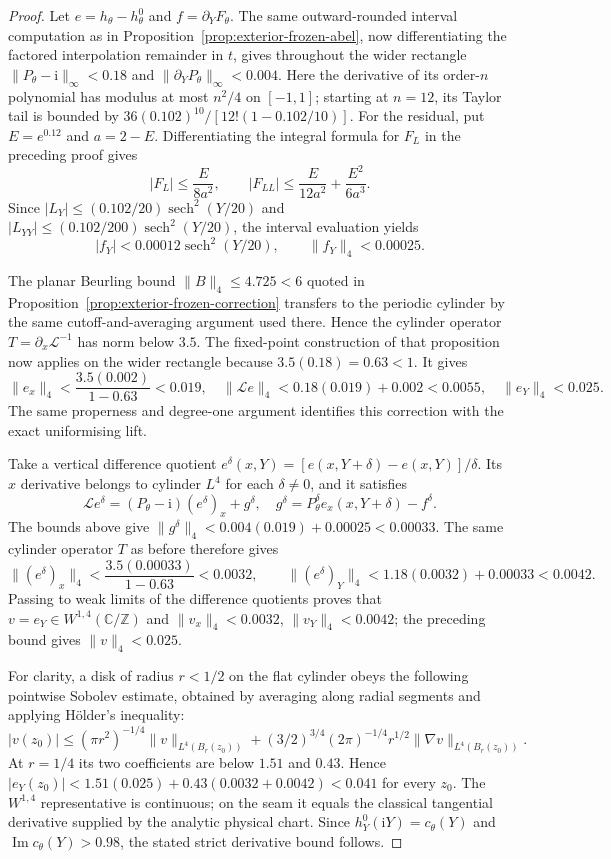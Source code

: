 \documentclass[11pt]{amsart}
\theoremstyle{definition}
\newcommand{\ii}{\mathrm{i}}
\begin{document}
\begin{proof}
Let $e=h_\theta-h^0_\theta$ and $f=\partial_YF_\theta$.
The same outward-rounded interval computation as in
Proposition~\ref{prop:exterior-frozen-abel}, now differentiating
the factored interpolation remainder in $t$, gives throughout the
wider rectangle
$\|P_\theta-\ii\|_\infty<0.18$ and
$\|\partial_YP_\theta\|_\infty<0.004$.
Here the derivative of its order-$n$ polynomial has modulus at most
$n^2/4$ on $[-1,1]$; starting at $n=12$, its Taylor tail is bounded by
$36(0.102)^{10}/[12!(1-0.102/10)]$.
For the residual, put $E=e^{0.12}$ and $a=2-E$.  Differentiating
the integral formula for $F_L$ in the preceding proof gives
\[
 |F_L|\le\frac{E}{8a^2},\qquad
 |F_{LL}|\le\frac{E}{12a^2}+\frac{E^2}{6a^3}.
\]
Since $|L_Y|\le(0.102/20)\operatorname{sech}^2(Y/20)$ and
$|L_{YY}|\le(0.102/200)\operatorname{sech}^2(Y/20)$,
the interval evaluation yields
\[
 |f_Y|<0.00012\operatorname{sech}^2(Y/20),
 \qquad \|f_Y\|_4<0.00025.
\]

The planar Beurling bound $\|B\|_4\le4.725<6$ quoted in
Proposition~\ref{prop:exterior-frozen-correction} transfers to the
periodic cylinder by the same cutoff-and-averaging argument used
there.  Hence the cylinder operator
$T=\partial_x\mathcal L^{-1}$ has norm below $3.5$.
The fixed-point construction of that proposition now applies on
the wider rectangle because $3.5(0.18)=0.63<1$.  It gives
\[
 \|e_x\|_4<\frac{3.5(0.002)}{1-0.63}<0.019,
 \quad \|\mathcal Le\|_4<0.18(0.019)+0.002<0.0055,
 \quad \|e_Y\|_4<0.025.
\]
The same properness and degree-one argument identifies this
correction with the exact uniformising lift.

Take a vertical difference quotient $e^\delta(x,Y)
=[e(x,Y+\delta)-e(x,Y)]/\delta$.  Its $x$ derivative belongs
to cylinder $L^4$ for each $\delta\ne0$, and it satisfies
\[
 \mathcal Le^\delta=(P_\theta-\ii)(e^\delta)_x+g^\delta,
 \quad
 g^\delta=P_\theta^\delta e_x(x,Y+\delta)-f^\delta.
\]
The bounds above give
$\|g^\delta\|_4<0.004(0.019)+0.00025<0.00033$.
The same cylinder operator $T$ as before therefore gives
\[
 \|(e^\delta)_x\|_4
 <\frac{3.5(0.00033)}{1-0.63}<0.0032,
 \qquad
 \|(e^\delta)_Y\|_4
 <1.18(0.0032)+0.00033<0.0042.
\]
Passing to weak limits of the difference quotients proves that
$v=e_Y\in W^{1,4}(\mathbb C/\mathbb Z)$ and
$\|v_x\|_4<0.0032$, $\|v_Y\|_4<0.0042$;
the preceding bound gives $\|v\|_4<0.025$.

For clarity, a disk of radius $r<1/2$ on the flat cylinder obeys
the following pointwise Sobolev estimate, obtained by averaging
along radial segments and applying H\"older's inequality:
\[
 |v(z_0)|\le(\pi r^2)^{-1/4}\|v\|_{L^4(B_r(z_0))}
 +(3/2)^{3/4}(2\pi)^{-1/4}r^{1/2}
        \|\nabla v\|_{L^4(B_r(z_0))}.
\]
At $r=1/4$ its two coefficients are below $1.51$ and $0.43$.
Hence $|e_Y(z_0)|<1.51(0.025)+0.43(0.0032+0.0042)<0.041$
for every $z_0$.  The $W^{1,4}$ representative is continuous;
on the seam it equals the classical tangential derivative supplied
by the analytic physical chart.  Since
$h^0_Y(\ii Y)=c_\theta(Y)$ and
$\operatorname{Im}c_\theta(Y)>0.98$, the stated strict derivative
bound follows.


\end{proof}
\end{document}
